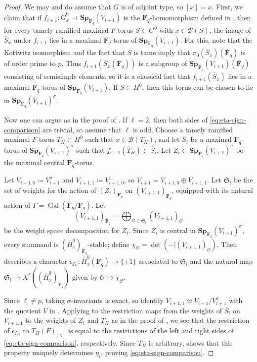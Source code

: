 \documentclass[reqno]{amsart}
\numberwithin{equation}{subsection}
\newcommand{\F}{\mathbf{F}}
\newcommand{\Gal}{\operatorname{Gal}}
\newcommand{\ol}[1]{\overline{#1}}
\newcommand{\co}{\colon}
\newcommand\cB{\mathcal{B}}
\newcommand\cO{\mathcal{O}}
\theoremstyle{remark}
\numberwithin{equation}{subsection}
\numberwithin{figure}{subsection}
\begin{document}
\begin{proof}We may and do assume that $G$ is of adjoint type, so $[x] = x$. First, we claim that if $f_{i+1}\co \ol G_x^0 \to \mathbf{Sp}_{\F_q}(V_{i+1})$ is the $\F_q$-homomorphism defined in \cite[Lemma~6.3.2]{CF26a}, then for every tamely ramified maximal $F$-torus $S \subset G^0$ with $x \in \cB(S)$, the image of $\ol S_x$ under $f_{i+1}$ lies in a maximal $\F_q$-torus of $\mathbf{Sp}_{\F_q}(V_{i+1})$. For this, note that the Kottwitz isomorphism \cite[Corollary 11.7.2]{KP} and the fact that $S$ is tame imply that $\pi_0(\ol S_x)(\ol\F_q)$ is of order prime to $p$. Thus $f_{i+1}(\ol S_x(\ol\F_q))$ is a subgroup of $\mathbf{Sp}_{\F_q}(V_{i+1})(\ol\F_q)$ consisting of semisimple elements, so it is a classical fact that $f_{i+1}(\ol S_x)$ lies in a maximal $\F_q$-torus of $\mathbf{Sp}_{\F_q}(V_{i+1})$. If $S \subset H^0$, then this torus can be chosen to lie in $\mathbf{Sp}_{\F_q}(V_{i+1})^\sigma$.

Now one can argue as in the proof of \cite[Lemma~3.2.2]{CF26a}. If $\ell=2$, then both sides of \eqref{eq:eta-sign-comparison} are trivial, so assume that $\ell$ is odd. Choose a tamely ramified maximal $F$-torus $T_H \subset H^0$ such that $x \in \cB(T_H)$, and let $\ol S_i$ be a maximal $\F_q$-torus of $\mathbf{Sp}_{\F_q}(V_{i+1})^\sigma$ such that $f_{i+1}(\ol T_H) \subset \ol S_i$. Let $Z_i \subset \mathbf{Sp}_{\F_q}(V_{i+1})^\sigma$ be the maximal central $\F_q$-torus.

Let $V_{i+1,0}\coloneqq V_{i+1}^\sigma$ and $V_{i+1,1}\coloneqq V_{i+1,0}^\perp$, so $V_{i+1} = V_{i+1, 0} \oplus V_{i+1, 1}$. Let $\mathfrak{S}_i$ be the set of weights for the action of $(Z_i)_{\ol\F_q}$ on $(V_{i+1,1})_{\ol\F_q}$, equipped with its natural action of $\Gamma=\Gal(\ol\F_q/\F_q)$. Let
\[
(V_{i+1,1})_{\ol\F_q}=\bigoplus_{\cO\in\mathfrak{S}_i}(V_{i+1,1})_\cO
\]
be the weight space decomposition for $Z_i$. Since $Z_i$ is central in $\mathbf{Sp}_{\F_q}(V_{i+1})^\sigma$, every summand is $(\ol H_x^0)_{\ol\F_q}$-stable; define $\chi_\cO=\det(-|(V_{i+1,1})_\cO)$.
Then \cite[Proposition 5.1.13]{FKS23} describes a character $\epsilon_{\mathfrak{S}_i}\co\ol H_x^0(\F_q)\to\{\pm1\}$ associated to $\mathfrak{S}_i$ and the natural map $\mathfrak{S}_i\to X^*((\ol H_x^0)_{\ol\F_q})$ given by $\cO\mapsto\chi_\cO$.

Since $\ell\ne p$, taking $\sigma$-invariants is exact, so \cite[Lemmas~6.4.4(1) and 6.3.1]{CF26a} identify $V_{i+1,1}\simeq V_{i+1}/V_{i+1}^\sigma$ with the quotient $V$ in \cite[Lemma~3.2.2]{CF26a}. Applying \cite[Remark 5.1.12]{FKS23} to
the restriction maps from the weights of $\ol S_i$ on $V_{i+1,1}$ to the weights of $Z_i$ and $\ol T_H$
as in the proof of \cite[Lemma~3.2.2]{CF26a}, we see that the restriction of $\epsilon_{\mathfrak{S}_i}$ to $T_H(F)_{[x]}$ is equal to the restrictions of the left and right sides of \eqref{eq:eta-sign-comparison}, respectively. Since $T_H$ is arbitrary, \cite[Lemma 3.5]{FKS23} shows that this property uniquely determines $\eta_i$, proving \eqref{eq:eta-sign-comparison}.
\end{proof}
\end{document}
